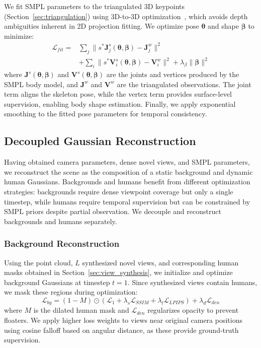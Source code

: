 \documentclass[acmtog]{acmart}
\begin{document}
We fit SMPL parameters to the triangulated 3D keypoints (Section~\ref{sec:triangulation}) using 3D-to-3D optimization~\cite{javerliat2025kineo}, which avoids depth ambiguities inherent in 2D projection fitting.
We optimize pose $\boldsymbol{\theta}$ and shape $\boldsymbol{\beta}$ to minimize:
\begin{equation}
\begin{split}
\mathcal{L}_{fit} = &\sum_{j} \|s^* \mathbf{J}^{s}_j(\boldsymbol{\theta}, \boldsymbol{\beta}) - \mathbf{J}^{w}_j\|^2 \\
&+ \sum_{i} \|s^* \mathbf{V}^{s}_i(\boldsymbol{\theta}, \boldsymbol{\beta}) - \mathbf{V}^{w}_i\|^2 + \lambda_\beta \|\boldsymbol{\beta}\|^2
\end{split}
\end{equation}
where $\mathbf{J}^{s}(\boldsymbol{\theta}, \boldsymbol{\beta})$ and $\mathbf{V}^{s}(\boldsymbol{\theta}, \boldsymbol{\beta})$ are the joints and vertices produced by the SMPL body model, and $\mathbf{J}^{w}$ and $\mathbf{V}^{w}$ are the triangulated observations.
The joint term aligns the skeleton pose, while the vertex term provides surface-level supervision, enabling body shape estimation. Finally, we apply exponential smoothing to the fitted pose parameters for temporal consistency.

\subsection{Decoupled Gaussian Reconstruction}
\label{sec:gaussian}

Having obtained camera parameters, dense novel views, and SMPL parameters, we reconstruct the scene as the composition of a static background and dynamic human Gaussians.
Backgrounds and humans benefit from different optimization strategies: backgrounds require dense viewpoint coverage but only a single timestep, while humans require temporal supervision but can be constrained by SMPL priors despite partial observation.
We decouple and reconstruct backgrounds and humans separately.

\subsubsection{Background Reconstruction}

Using the point cloud, $L$ synthesized novel views, and corresponding human masks obtained in Section~\ref{sec:view_synthesis}, we initialize and optimize background Gaussians at timestep $t=1$.
Since synthesized views contain humans, we mask these regions during optimization:
\begin{equation}
\mathcal{L}_{bg} = (1 - M) \odot \left(\mathcal{L}_1 + \lambda_s \mathcal{L}_{SSIM} + \lambda_l \mathcal{L}_{LPIPS}\right) + \lambda_d \mathcal{L}_{den}
\end{equation}
where $M$ is the dilated human mask and $\mathcal{L}_{den}$ regularizes opacity to prevent floaters.
We apply higher loss weights to views near original camera positions using cosine falloff based on angular distance, as these provide ground-truth supervision.
\end{document}
